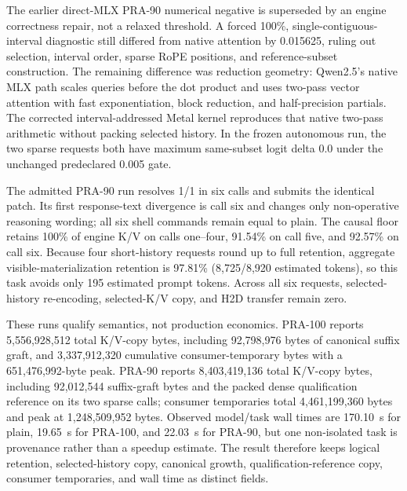 \documentclass[11pt]{article}
\begin{document}
The earlier direct-MLX PRA-90 numerical negative is superseded by an engine
correctness repair, not a relaxed threshold.  A forced 100\%, single-contiguous-
interval diagnostic still differed from native attention by 0.015625, ruling
out selection, interval order, sparse RoPE positions, and reference-subset
construction.  The remaining difference was reduction geometry: Qwen2.5's
native MLX path scales queries before the dot product and uses two-pass vector
attention with fast exponentiation, block reduction, and half-precision
partials.  The corrected interval-addressed Metal kernel reproduces that
native two-pass arithmetic without packing selected history.  In the frozen
autonomous run, the two sparse requests both have maximum same-subset logit
delta 0.0 under the unchanged predeclared 0.005 gate.

The admitted PRA-90 run resolves 1/1 in six calls and submits the identical
patch.  Its first response-text divergence is call six and changes only
non-operative reasoning wording; all six shell commands remain equal to plain.
The causal floor retains 100\% of engine K/V on calls one--four, 91.54\% on call
five, and 92.57\% on call six.  Because four short-history requests round up to
full retention, aggregate visible-materialization retention is 97.81\%
(8,725/8,920 estimated tokens), so this task avoids only 195 estimated prompt
tokens.  Across all six requests, selected-history re-encoding, selected-K/V
copy, and H2D transfer remain zero.

These runs qualify semantics, not production economics.  PRA-100 reports
5,556,928,512 total K/V-copy bytes, including 92,798,976 bytes of canonical
suffix graft, and 3,337,912,320 cumulative consumer-temporary bytes with a
651,476,992-byte peak.  PRA-90 reports 8,403,419,136 total K/V-copy bytes,
including 92,012,544 suffix-graft bytes and the packed dense qualification
reference on its two sparse calls; consumer temporaries total 4,461,199,360
bytes and peak at 1,248,509,952 bytes.  Observed model/task wall times are
170.10~s for plain, 19.65~s for PRA-100, and 22.03~s for PRA-90, but one
non-isolated task is provenance rather than a speedup estimate.  The result
therefore keeps logical retention, selected-history copy, canonical growth,
qualification-reference copy, consumer temporaries, and wall time as distinct
fields.
\end{document}
